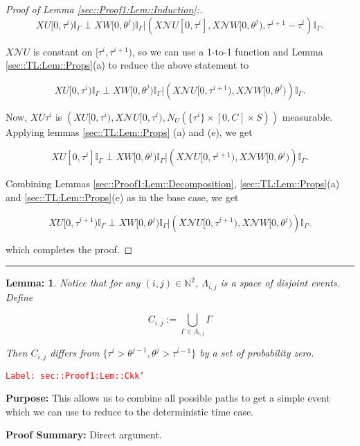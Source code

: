 \documentclass[12pt]{article}
\newcommand{\mb}{\mathbb}
\newcommand{\mc}{\mathcal}
\newcommand{\tr}{\textcolor{red}}
\newcommand{\labe}[1]{\tr{\texttt{Label: #1}}}
\newcommand{\purpose}{\textbf{Purpose: }}
\newcommand{\pfsum}{\textbf{Proof Summary: }}
\newcommand{\lin}{\rule{\linewidth}{0.4 pt}}
\newcommand{\neigh}{\mc{N}}					%
\renewcommand{\U}{U}							%
\newcommand{\UU}{W}								%
\renewcommand{\S}{S}							%
\newcommand{\X}{X}								%
\newcommand{\poiss}[1]{N_{#1}}						%
\newcommand{\rt}[1]{\tau^{#1}}						%
\newcommand{\rtt}[1]{\theta^{#1}}					%
\newcommand{\itt}{i}								%
\newcommand{\ittt}{j}								%
\newcommand{\const}[1]{C_{#1}}						%
\newcommand{\apath}{\Gamma}						%
\newcommand{\pathset}[2]{\Lambda_{#1,#2}}			%
\newcommand{\pathsete}[2]{C_{#1,#2}}			%
\newtheorem{lem}[thms]{Lemma: }
\begin{document}
\begin{proof}[Proof of Lemma \ref{sec::Proof1:Lem::Induction}:]
\[\X{\U}{[0,\rt{\itt})}\mb{I}_{\apath}\perp \X{\UU}{[0,\rtt{\ittt})}\mb{I}_{\apath}|\left(\X{\neigh{\U}}{[0,\rt{\itt}]},\X{\neigh{\UU}}{[0,\rtt{\ittt})},\rt{\itt+1} - \rt{\itt}\right)\mb{I}_{\apath}.\]

\(\X{\neigh{\U}}{}\) is constant on \([\rt{\itt},\rt{\itt+1})\), so we can use a 1-to-1 function and Lemma \ref{sec::TL:Lem::Props}(a) to reduce the above statement to

\[\X{\U}{[0,\rt{\itt})}\mb{I}_{\apath}\perp \X{\UU}{[0,\rtt{\ittt})}\mb{I}_{\apath}|\left(\X{\neigh{\U}}{[0,\rt{\itt+1})},\X{\neigh{\UU}}{[0,\rtt{\ittt})}\right)\mb{I}_{\apath}.\]

Now, \(\X{\U}{\rt{\itt}}\) is \(\left(\X{\U}{[0,\rt{\itt})}, \X{\neigh{\U}}{[0,\rt{\itt})}, \poiss{\U}(\{\rt{\itt}\}\times [0,\const{}]\times\S)\right)\) measurable. Applying lemmas \ref{sec::TL:Lem::Props} (a) and (e), we get

\[\X{\U}{[0,\rt{\itt}]}\mb{I}_{\apath}\perp \X{\UU}{[0,\rtt{\ittt})}\mb{I}_{\apath}|\left(\X{\neigh{\U}}{[0,\rt{\itt+1})},\X{\neigh{\UU}}{[0,\rtt{\ittt})}\right)\mb{I}_{\apath}.\]

Combining Lemmas \ref{sec::Proof1:Lem::Decomposition}, \ref{sec::TL:Lem::Props}(a) and \ref{sec::TL:Lem::Props}(e) as in the base case, we get

\[\X{\U}{[0,\rt{\itt+1})}\mb{I}_{\apath}\perp \X{\UU}{[0,\rtt{\ittt})}\mb{I}_{\apath}|\left(\X{\neigh{\U}}{[0,\rt{\itt+1})},\X{\neigh{\UU}}{[0,\rtt{\ittt})}\right)\mb{I}_{\apath}.\]

which completes the proof.
\end{proof}

\lin

\begin{lem}
Notice that for any \((\itt,\ittt) \in \mb{N}^2\), \(\pathset{\itt}{\ittt}\) is a space of disjoint events. Define

\[\pathsete{\itt}{\ittt} := \bigcup_{\apath\in\pathset{\itt}{\ittt}} \apath\]

Then \(\pathsete{\itt}{\ittt}\) differs from \(\{\rt{\itt} > \rtt{\ittt-1}, \rtt{\ittt} > \rt{\itt-1}\}\) by a set of probability zero.
\label{sec::Proof1:Lem::Ckk'}
\end{lem}
\labe{sec::Proof1:Lem::Ckk'}

\purpose This allows us to combine all possible paths to get a simple event which we can use to reduce to the deterministic time case.

\pfsum Direct argument.
\end{document}
